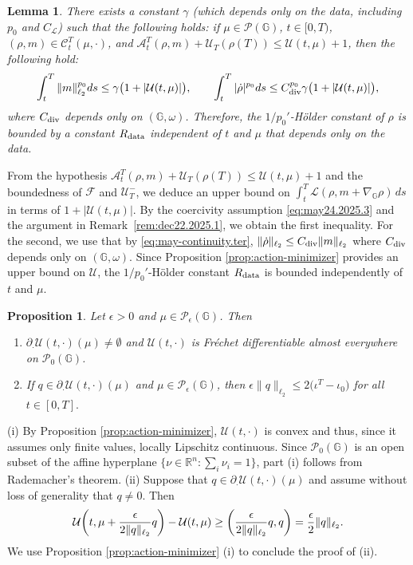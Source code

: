 \documentclass[10pt]{article}
\newtheorem{lemma}[theorem]{Lemma}
\newtheorem{proposition}[theorem]{Proposition}
\numberwithin{equation}{section}
\newcommand{\cA}{ \mathcal{A}}
\newcommand{\cC}{ \mathcal{C}}
\newcommand{\cF}{ \mathcal{F}}
\newcommand{\cL}{ \mathcal{L}}
\newcommand{\cP}{ \mathcal{P}}
\newcommand{\cU}{ \mathcal{U}}
\newcommand{\bG}{\mathbb G}
\newcommand{\bR}{\mathbb R}
\def\cL{\mathcal{L}}
\def\G{\mathbb{G}}
\begin{document}
%
\begin{lemma}\label{lem:bound-on-m-rho-dotb} There exists a constant $\gamma$ (which depends only on the data, including $p_0$ and $C_{\cL}$) such that the following holds:  if $\mu \in \cP(\bG)$,  $t\in [0,T)$, $(\rho, m) \in \cC_t^T(\mu, \cdot)$, and $\cA_t^T(\rho, m)+ \cU_T(\rho(T)) \leq \cU(t, \mu)+1$, then the following hold:
\[
\int_t^T \|m\|^{p_0}_{\ell_2} ds \leq \gamma\big(1 +|\cU(t, \mu)|\big), \qquad \int_t^T|\dot \rho|^{p_0} ds \leq C_{\rm div}^{p_0} \gamma\big(1 +|\cU(t, \mu)|\big),
\]
where $C_{\rm div}$ depends only on $(\G,\omega)$.
Therefore, the $1/p_0'$-H\"older constant of $\rho$ is bounded by a constant $R_{\rm data}$ independent of $t$ and $\mu$ that depends only on the data.
\end{lemma}
%
\proof{} From the hypothesis $\cA_t^T(\rho, m)+ \cU_T(\rho(T)) \leq \cU(t, \mu)+1$ and the boundedness of $\cF$ and $\cU_T^-$, we deduce an upper bound on $\int_t^T \cL(\rho, m+\nabla_\bG\rho)\,ds$ in terms of $1+|\cU(t,\mu)|$. By the coercivity assumption \eqref{eq:may24.2025.3} and the argument in Remark~\ref{rem:dec22.2025.1}, we obtain the first inequality. For the second, we use that by \eqref{eq:may-continuity.ter}, $\|\dot \rho\|_{\ell_2} \leq C_{\rm div} \|m\|_{\ell_2}$ where $C_{\rm div}$ depends only on $(\G,\omega)$. Since Proposition \ref{prop:action-minimizer} provides an upper bound on $\cU$, the $1/p_0'$-H\"older constant $R_{\rm data}$ is bounded independently of $t$ and $\mu$. \endproof


%
%
\begin{proposition}\label{prop:action-frechet} Let $\epsilon>0$ and $\mu \in \cP_\epsilon(\G)$. Then
\begin{enumerate}
\item[(i)]  $\partial_\cdot   \cU(t, \cdot)(\mu)\not=\emptyset$ and $\cU(t, \cdot)$ is Fr\'echet differentiable almost everywhere on $\cP_0(\G)$.
\item[(ii)] If $q \in \partial_\cdot \cU(t, \cdot)(\mu)$ and $\mu \in \cP_\epsilon(\G)$, then $ \epsilon\|q\|_{\ell_2} \leq 2\big(\iota^T-\iota_0\big)$ for all $t\in [0,T].$
\end{enumerate}
\end{proposition}
%
\proof{} (i) By Proposition \ref{prop:action-minimizer}, $\cU(t, \cdot)$ is convex and thus, since it assumes only finite values, locally Lipschitz continuous. Since $\cP_0(\G)$ is an open subset of the affine hyperplane $\{\nu\in\bR^n:\sum_i\nu_i=1\}$, part (i) follows from Rademacher's theorem. (ii) Suppose that $q \in \partial_\cdot \cU(t, \cdot)(\mu)$ and assume without loss of generality that $q \not =0.$ Then 
\[
\cU\bigg(t, \mu+{\epsilon \over 2 \|q\|_{\ell_2}}q \bigg)-\cU(t, \mu) \geq \bigg({\epsilon \over 2 \|q\|_{\ell_2}}q, q\bigg)={\epsilon \over 2}\|q\|_{\ell_2}.
\]
We use Proposition \ref{prop:action-minimizer} (i) to conclude the proof of (ii).  \endproof
\end{document}

